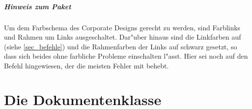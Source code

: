 \documentclass[twoside,colorback,accentcolor=tud4c,11pt]{tudreport}
\begin{document}
  \paragraph{Hinweis zum Paket \texorpdfstring{}{hyperref}}
    Um dem Farbschema des Corporate Designs gerecht zu werden, sind Farblinks und Rahmen um Links
    ausgeschaltet. Dar"uber hinaus sind die Linkfarben auf  (siehe
    \ref{sec_befehle}) und die Rahmenfarben der Links auf schwarz gesetzt, so dass sich beides ohne
    farbliche Probleme einschalten l"asst. Hier sei noch auf den Befehl  hingewiesen, der die meisten Fehler mit
     behebt.

\chapter{Die Dokumentenklasse \texorpdfstring{}{tudreport}}\label{chap:tudreport}
\end{document}
